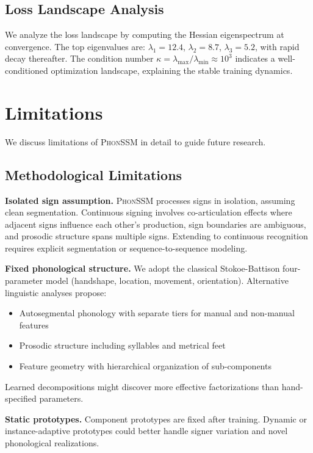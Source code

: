 \documentclass{article}
\theoremstyle{definition}
\theoremstyle{remark}
\newcommand{\phonssm}{\textsc{PhonSSM}}
\begin{document}
\subsection{Loss Landscape Analysis}

We analyze the loss landscape by computing the Hessian eigenspectrum at convergence. The top eigenvalues are: $\lambda_1 = 12.4$, $\lambda_2 = 8.7$, $\lambda_3 = 5.2$, with rapid decay thereafter. The condition number $\kappa = \lambda_{\max}/\lambda_{\min} \approx 10^3$ indicates a well-conditioned optimization landscape, explaining the stable training dynamics.

\section{Limitations}
\label{app:limitations}

We discuss limitations of \phonssm{} in detail to guide future research.

\subsection{Methodological Limitations}

\textbf{Isolated sign assumption.} \phonssm{} processes signs in isolation, assuming clean segmentation. Continuous signing involves co-articulation effects where adjacent signs influence each other's production, sign boundaries are ambiguous, and prosodic structure spans multiple signs. Extending to continuous recognition requires explicit segmentation or sequence-to-sequence modeling.

\textbf{Fixed phonological structure.} We adopt the classical Stokoe-Battison four-parameter model (handshape, location, movement, orientation). Alternative linguistic analyses propose:
\begin{itemize}[nosep,topsep=2pt,leftmargin=*]
\item Autosegmental phonology with separate tiers for manual and non-manual features
\item Prosodic structure including syllables and metrical feet
\item Feature geometry with hierarchical organization of sub-components
\end{itemize}
Learned decompositions might discover more effective factorizations than hand-specified parameters.

\textbf{Static prototypes.} Component prototypes are fixed after training. Dynamic or instance-adaptive prototypes could better handle signer variation and novel phonological realizations.
\end{document}
